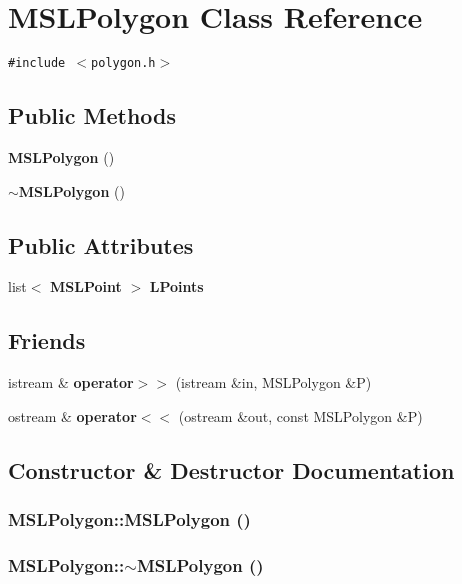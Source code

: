 \section{MSLPolygon  Class Reference}
\label{classMSLPolygon}
{\tt \#include $<$polygon.h$>$}

\subsection*{Public Methods}
\begin{CompactItemize}
\item 
{\bf MSLPolygon} ()
\item 
{\bf $\sim$MSLPolygon} ()
\end{CompactItemize}
\subsection*{Public Attributes}
\begin{CompactItemize}
\item 
list$<$ {\bf MSLPoint} $>$ {\bf LPoints}
\end{CompactItemize}
\subsection*{Friends}
\begin{CompactItemize}
\item 
istream \& {\bf operator$>$$>$} (istream \&in, MSLPolygon \&P)
\item 
ostream \& {\bf operator$<$$<$} (ostream \&out, const MSLPolygon \&P)
\end{CompactItemize}


\subsection{Constructor \& Destructor Documentation}
\subsubsection{\setlength{\rightskip}{0pt plus 5cm}MSLPolygon::MSLPolygon ()\hspace{0.3cm}{\tt  [inline]}}\label{classMSLPolygon_a0}


\subsubsection{\setlength{\rightskip}{0pt plus 5cm}MSLPolygon::$\sim$MSLPolygon ()\hspace{0.3cm}{\tt  [inline]}}\label{classMSLPolygon_a1}




